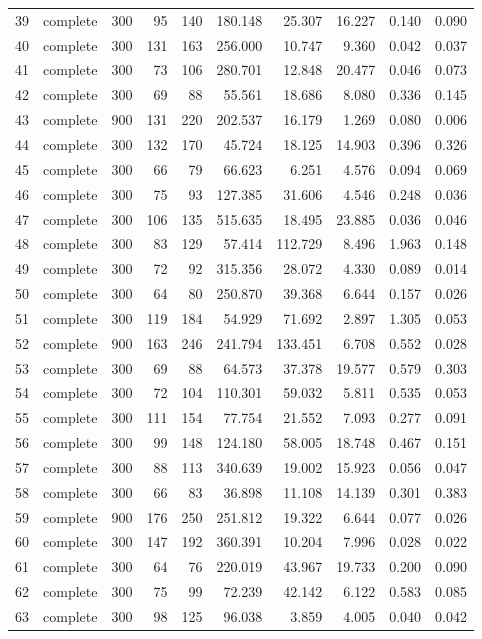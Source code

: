 \begin{longtable}{rcrrrrrrrr}
39 & complete & 300 & 95 & 140 & 180.148 & 25.307 & 16.227 & 0.140 & 0.090 \\
40 & complete & 300 & 131 & 163 & 256.000 & 10.747 & 9.360 & 0.042 & 0.037 \\
41 & complete & 300 & 73 & 106 & 280.701 & 12.848 & 20.477 & 0.046 & 0.073 \\
42 & complete & 300 & 69 & 88 & 55.561 & 18.686 & 8.080 & 0.336 & 0.145 \\
43 & complete & 900 & 131 & 220 & 202.537 & 16.179 & 1.269 & 0.080 & 0.006 \\
44 & complete & 300 & 132 & 170 & 45.724 & 18.125 & 14.903 & 0.396 & 0.326 \\
45 & complete & 300 & 66 & 79 & 66.623 & 6.251 & 4.576 & 0.094 & 0.069 \\
46 & complete & 300 & 75 & 93 & 127.385 & 31.606 & 4.546 & 0.248 & 0.036 \\
47 & complete & 300 & 106 & 135 & 515.635 & 18.495 & 23.885 & 0.036 & 0.046 \\
48 & complete & 300 & 83 & 129 & 57.414 & 112.729 & 8.496 & 1.963 & 0.148 \\
49 & complete & 300 & 72 & 92 & 315.356 & 28.072 & 4.330 & 0.089 & 0.014 \\
50 & complete & 300 & 64 & 80 & 250.870 & 39.368 & 6.644 & 0.157 & 0.026 \\
51 & complete & 300 & 119 & 184 & 54.929 & 71.692 & 2.897 & 1.305 & 0.053 \\
52 & complete & 900 & 163 & 246 & 241.794 & 133.451 & 6.708 & 0.552 & 0.028 \\
53 & complete & 300 & 69 & 88 & 64.573 & 37.378 & 19.577 & 0.579 & 0.303 \\
54 & complete & 300 & 72 & 104 & 110.301 & 59.032 & 5.811 & 0.535 & 0.053 \\
55 & complete & 300 & 111 & 154 & 77.754 & 21.552 & 7.093 & 0.277 & 0.091 \\
56 & complete & 300 & 99 & 148 & 124.180 & 58.005 & 18.748 & 0.467 & 0.151 \\
57 & complete & 300 & 88 & 113 & 340.639 & 19.002 & 15.923 & 0.056 & 0.047 \\
58 & complete & 300 & 66 & 83 & 36.898 & 11.108 & 14.139 & 0.301 & 0.383 \\
59 & complete & 900 & 176 & 250 & 251.812 & 19.322 & 6.644 & 0.077 & 0.026 \\
60 & complete & 300 & 147 & 192 & 360.391 & 10.204 & 7.996 & 0.028 & 0.022 \\
61 & complete & 300 & 64 & 76 & 220.019 & 43.967 & 19.733 & 0.200 & 0.090 \\
62 & complete & 300 & 75 & 99 & 72.239 & 42.142 & 6.122 & 0.583 & 0.085 \\
63 & complete & 300 & 98 & 125 & 96.038 & 3.859 & 4.005 & 0.040 & 0.042 \\
\bottomrule
\end{longtable}
